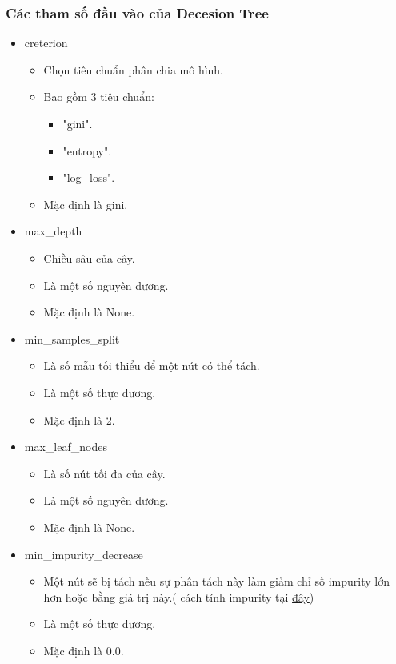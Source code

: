 \documentclass[12pt, a4paper]{article}
\begin{document}
\subsubsection{Các tham số đầu vào của Decesion Tree}
\begin{itemize}
    \item creterion\begin{itemize}
        \item Chọn tiêu chuẩn phân chia mô hình.
        \item Bao gồm 3 tiêu chuẩn:\begin{itemize}
            \item "gini".
            \item "entropy".
            \item "log\_loss".
        \end{itemize}
        \item Mặc định là gini.
    \end{itemize}
    \item max\_depth \begin{itemize}
        \item Chiều sâu của cây.
        \item Là một số nguyên dương.
        \item Mặc định là None.
    \end{itemize}
    \item min\_samples\_split \begin{itemize}
        \item Là số mẫu tối thiểu để một nút có thể tách.
        \item Là một số thực dương.
        \item Mặc định là 2.
    \end{itemize}
    \item max\_leaf\_nodes \begin{itemize}
        \item Là số nút tối đa của cây.
        \item Là một số nguyên dương.
        \item Mặc định là None.
    \end{itemize}
    \item min\_impurity\_decrease \begin{itemize}
        \item Một nút sẽ bị tách nếu sự phân tách này làm giảm chỉ số impurity lớn hơn hoặc bằng giá trị này.( cách tính impurity tại \href{https://scikit-learn.org/stable/modules/generated/sklearn.tree.DecisionTreeClassifier.html}{đây})
        \item Là một số thực dương.
        \item Mặc định là 0.0.
    \end{itemize}
\end{itemize}
\end{document}
